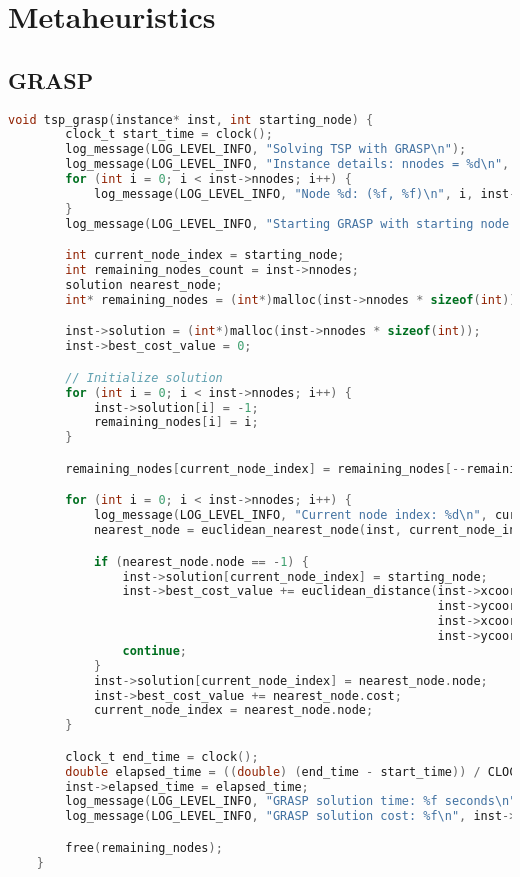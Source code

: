 \appendix
\section{Metaheuristics}
\subsection{GRASP}
\label{appendix:tsp_grasp}
\begin{lstlisting}[language=C]
    void tsp_grasp(instance* inst, int starting_node) {
        clock_t start_time = clock();
        log_message(LOG_LEVEL_INFO, "Solving TSP with GRASP\n");
        log_message(LOG_LEVEL_INFO, "Instance details: nnodes = %d\n", inst->nnodes);
        for (int i = 0; i < inst->nnodes; i++) {
            log_message(LOG_LEVEL_INFO, "Node %d: (%f, %f)\n", i, inst->xcoord[i], inst->ycoord[i]);
        }
        log_message(LOG_LEVEL_INFO, "Starting GRASP with starting node %d\n", starting_node);

        int current_node_index = starting_node;
        int remaining_nodes_count = inst->nnodes;
        solution nearest_node;
        int* remaining_nodes = (int*)malloc(inst->nnodes * sizeof(int));

        inst->solution = (int*)malloc(inst->nnodes * sizeof(int));
        inst->best_cost_value = 0;

        // Initialize solution
        for (int i = 0; i < inst->nnodes; i++) {
            inst->solution[i] = -1;
            remaining_nodes[i] = i;
        }

        remaining_nodes[current_node_index] = remaining_nodes[--remaining_nodes_count];

        for (int i = 0; i < inst->nnodes; i++) {
            log_message(LOG_LEVEL_INFO, "Current node index: %d\n", current_node_index);
            nearest_node = euclidean_nearest_node(inst, current_node_index, remaining_nodes, &remaining_nodes_count);

            if (nearest_node.node == -1) {
                inst->solution[current_node_index] = starting_node;
                inst->best_cost_value += euclidean_distance(inst->xcoord[current_node_index],
                                                            inst->ycoord[current_node_index],
                                                            inst->xcoord[starting_node],
                                                            inst->ycoord[starting_node], false);
                continue;
            }
            inst->solution[current_node_index] = nearest_node.node;
            inst->best_cost_value += nearest_node.cost;
            current_node_index = nearest_node.node;
        }

        clock_t end_time = clock();
        double elapsed_time = ((double) (end_time - start_time)) / CLOCKS_PER_SEC;
        inst->elapsed_time = elapsed_time;
        log_message(LOG_LEVEL_INFO, "GRASP solution time: %f seconds\n", elapsed_time);
        log_message(LOG_LEVEL_INFO, "GRASP solution cost: %f\n", inst->best_cost_value);

        free(remaining_nodes);
    }
\end{lstlisting}
\newpage

